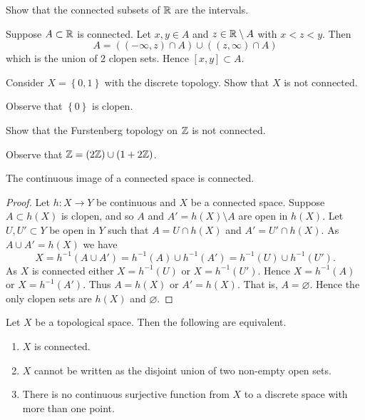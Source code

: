 \begin{problem}
	Show that the connected subsets of $\mathbb{R}$ are the intervals.
\end{problem}

\begin{solution}
	Suppose $A \subset \mathbb{R}$ is connected.
	Let $x,y \in A$ and $z \in \mathbb{R} \setminus A$ with 
	$x < z < y$.
	Then
	\[
		A = \left( 
			(-\infty, z) \cap A 
		\right) \cup \left( 
			(z,\infty) \cap A 
		\right)
	\]
	which is the union of 2 clopen sets. 
	Hence $[x,y] \subset A$.
\end{solution}

\begin{problem}
	Consider $X = \left\{
		0,1
	\right\}$ with the discrete topology.
	Show that $X$ is not connected.
\end{problem}

\begin{solution}
	Observe that $\left\{
		0
	\right\}$ is clopen.
\end{solution}

\begin{problem}
	Show that the Furstenberg topology on $\mathbb{Z}$ is not connected.
\end{problem}

\begin{solution}
	Observe that $
		\mathbb{Z} = (2\mathbb{Z}) \cup (1 + 2\mathbb{Z})
	$.
\end{solution}

\begin{theorem}[]
	The continuous image of a connected space is connected.
\end{theorem}

\begin{proof}
	Let $h: X \to Y$ be continuous and $X$ be a connected space.
	Suppose $A \subset h(X)$ is clopen, and so
	$A$ and $A' = h(X) \setminus A$ are open in $h(X)$.
	Let $U, U' \subset Y$ be open in $Y$ such that $A = U \cap h(X)$
	and $A' = U' \cap h(X)$.
	As $A \cup A' = h(X)$ we have
	\[
		X = h^{-1}(A \cup A')
		= h^{-1}(A) \cup h^{-1}(A')
		= h^{-1}(U) \cup h^{-1}(U').
	\]
	As $X$ is connected either $X = h^{-1}(U)$ or $X = h^{-1}(U')$.
	Hence $X = h^{-1}(A)$ or $X = h^{-1}(A')$.
	Thus $A = h(X)$ or $A' = h(X)$.
	That is, $A = \varnothing$.
	Hence the only clopen sets are $h(X)$ and $\varnothing$.
\end{proof}

\begin{proposition}[]
	Let $X$ be a topological space.
	Then the following are equivalent.
	\begin{enumerate}
		\item $X$ is connected.
		\item $X$ cannot be written as the disjoint union of two non-empty open
			sets.
		\item There is no continuous surjective function from $X$ to
			a discrete space with more than one point.
	\end{enumerate}
\end{proposition}

